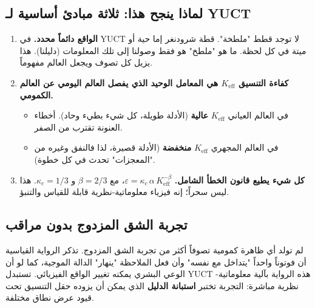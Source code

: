 \documentclass[12pt,a4paper]{article}
\theoremstyle{remark}
\begin{document}
	\subsection{لماذا ينجح هذا: ثلاثة مبادئ أساسية لـ YUCT}
	
	\begin{enumerate}[leftmargin=*]
		\item \textbf{الواقع دائماً محدد.}
		في YUCT لا توجد قطط "ملطخة". قطة شرودنغر إما حية أو ميتة في كل لحظة. ما هو "ملطخ" هو فقط وصولنا إلى تلك المعلومات (دليلنا). هذا يزيل كل تصوف ويجعل العالم مفهوماً.
		
		\item \textbf{كفاءة التنسيق \(K_{\mathrm{eff}}\) هي المعامل الوحيد الذي يفصل العالم اليومي عن العالم الكمومي.}
		\begin{itemize}
			\item في العالم العياني \(K_{\mathrm{eff}}\) \textbf{عالية} (الأدلة طويلة، كل شيء بطيء وحاد). أخطاء العنونة تقترب من الصفر.
			\item في العالم المجهري \(K_{\mathrm{eff}}\) \textbf{منخفضة} (الأدلة قصيرة، لذا فالنفق وغيره من "المعجزات" تحدث في كل خطوة).
		\end{itemize}
		
		\item \textbf{كل شيء يطيع قانون الخطأ الشامل.}
		\( \varepsilon = \kappa_c \, \alpha \, K_{\mathrm{eff}}^{-\beta} \)،
		مع \( \beta = 2/3 \) و \( \kappa_c = 1/3 \). هذا ليس سحراً؛ إنه فيزياء معلوماتية-نظرية قابلة للقياس والتنبؤ.
	\end{enumerate}
	
	\medskip
	
	\subsection{تجربة الشق المزدوج بدون مراقب}
	
	لم تولد أي ظاهرة كمومية تصوفاً أكثر من تجربة الشق المزدوج. تذكر الرواية القياسية أن فوتوناً واحداً "يتداخل مع نفسه" وأن فعل الملاحظة "ينهار" الدالة الموجية، كما لو أن الوعي البشري يمكنه تغيير الواقع الفيزيائي. تستبدل YUCT هذه الرواية بآلية معلوماتية-نظرية مباشرة: التجربة تختبر \textbf{استبانة الدليل} الذي يمكن أن يزوده حقل التنسيق تحت قيود عرض نطاق مختلفة.
	
\end{document}
